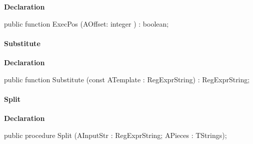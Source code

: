 \documentclass{report}
\newif\ifpdf
\begin{document}
\label{RegExpr.TRegExpr-ExecPos}
\begin{list}{}{
\setlength{\itemindent}{0cm}
\setlength{\listparindent}{0cm}
\setlength{\leftmargin}{\evensidemargin}
\addtolength{\leftmargin}{\tmplength}
\settowidth{\labelsep}{X}
\addtolength{\leftmargin}{\labelsep}
\setlength{\labelwidth}{\tmplength}
}
\item[\textbf{Declaration}\hfill]
\ifpdf
\begin{flushleft}
\fi
\begin{ttfamily}
public function ExecPos (AOffset: integer ) : boolean;\end{ttfamily}

\ifpdf
\end{flushleft}
\fi

\end{list}
\paragraph*{Substitute}\hspace*{\fill}

\label{RegExpr.TRegExpr-Substitute}
\begin{list}{}{
\setlength{\itemindent}{0cm}
\setlength{\listparindent}{0cm}
\setlength{\leftmargin}{\evensidemargin}
\addtolength{\leftmargin}{\tmplength}
\settowidth{\labelsep}{X}
\addtolength{\leftmargin}{\labelsep}
\setlength{\labelwidth}{\tmplength}
}
\item[\textbf{Declaration}\hfill]
\ifpdf
\begin{flushleft}
\fi
\begin{ttfamily}
public function Substitute (const ATemplate : RegExprString) : RegExprString;\end{ttfamily}

\ifpdf
\end{flushleft}
\fi

\end{list}
\paragraph*{Split}\hspace*{\fill}

\label{RegExpr.TRegExpr-Split}
\begin{list}{}{
\setlength{\itemindent}{0cm}
\setlength{\listparindent}{0cm}
\setlength{\leftmargin}{\evensidemargin}
\addtolength{\leftmargin}{\tmplength}
\settowidth{\labelsep}{X}
\addtolength{\leftmargin}{\labelsep}
\setlength{\labelwidth}{\tmplength}
}
\item[\textbf{Declaration}\hfill]
\ifpdf
\begin{flushleft}
\fi
\begin{ttfamily}
public procedure Split (AInputStr : RegExprString; APieces : TStrings);\end{ttfamily}

\ifpdf
\end{flushleft}
\fi

\end{list}
\end{document}
